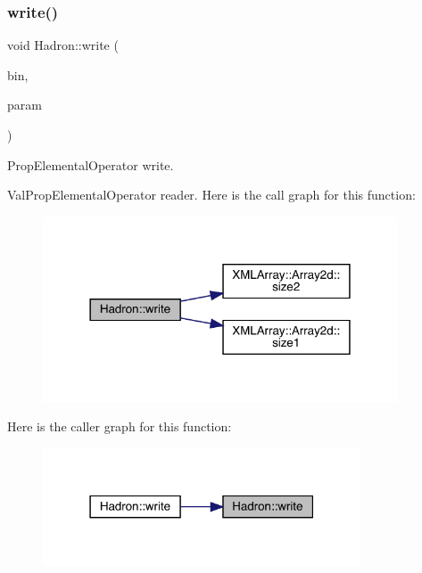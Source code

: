\subsubsection{\texorpdfstring{write()}{write()}\hspace{0.1cm}{\footnotesize\ttfamily [68/95]}}
{\footnotesize\ttfamily void Hadron\+::write (\begin{DoxyParamCaption}\item[{\mbox{\hyperlink{classADATIO_1_1BinaryWriter}{Binary\+Writer}} \&}]{bin,  }\item[{const \mbox{\hyperlink{structHadron_1_1ValPropElementalOperator__t}{Val\+Prop\+Elemental\+Operator\+\_\+t}} \&}]{param }\end{DoxyParamCaption})}



Prop\+Elemental\+Operator write. 

Val\+Prop\+Elemental\+Operator reader. Here is the call graph for this function\+:
\nopagebreak
\begin{figure}[H]
\begin{center}
\leavevmode
\includegraphics[width=298pt]{d1/daf/namespaceHadron_a4e777dd6c1ccf60b80a383fd5901627b_cgraph}
\end{center}
\end{figure}
Here is the caller graph for this function\+:
\nopagebreak
\begin{figure}[H]
\begin{center}
\leavevmode
\includegraphics[width=267pt]{d1/daf/namespaceHadron_a4e777dd6c1ccf60b80a383fd5901627b_icgraph}
\end{center}
\end{figure}
\mbox{\label{namespaceHadron_a78737ee2e9f7f708d926ec9f531c8f61}} 
